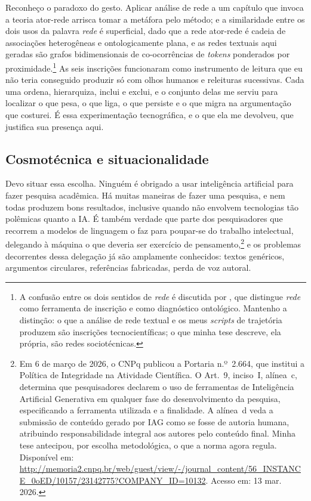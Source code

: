 Reconheço o paradoxo do gesto. Aplicar análise de rede a um capítulo que invoca a teoria ator-rede arrisca tomar a metáfora pelo método; e a similaridade entre os dois usos da palavra \textit{rede} é superficial, dado que a rede ator-rede é cadeia de associações heterogêneas e ontologicamente plana, e as redes textuais aqui geradas são grafos bidimensionais de co-ocorrências de \textit{tokens} ponderados por proximidade.\footnote{A confusão entre os dois sentidos de \textit{rede} é discutida por \textcite[pp.~129--132]{Latour2007Reassembling}, que distingue \textit{rede} como ferramenta de inscrição e como diagnóstico ontológico. Mantenho a distinção: o que a análise de rede textual e os meus \textit{scripts} de trajetória produzem são inscrições tecnocientíficas; o que minha tese descreve, ela própria, são redes sociotécnicas.} As seis inscrições funcionaram como instrumento de leitura que eu não teria conseguido produzir só com olhos humanos e releituras sucessivas. Cada uma ordena, hierarquiza, inclui e exclui, e o conjunto delas me serviu para localizar o que pesa, o que liga, o que persiste e o que migra na argumentação que costurei. É essa experimentação tecnográfica, e o que ela me devolveu, que justifica sua presença aqui.

\subsection{Cosmotécnica e situacionalidade}

Devo situar essa escolha. Ninguém é obrigado a usar inteligência artificial para fazer pesquisa acadêmica. Há muitas maneiras de fazer uma pesquisa, e nem todas produzem bons resultados, inclusive quando não envolvem tecnologias tão polêmicas quanto a IA. É também verdade que parte dos pesquisadores que recorrem a modelos de linguagem o faz para poupar-se do trabalho intelectual, delegando à máquina o que deveria ser exercício de pensamento,\footnote{Em 6 de março de 2026, o CNPq publicou a Portaria n.º~2.664, que institui a Política de Integridade na Atividade Científica. O Art.~9, inciso~I, alínea~c, determina que pesquisadores declarem o uso de ferramentas de Inteligência Artificial Generativa em qualquer fase do desenvolvimento da pesquisa, especificando a ferramenta utilizada e a finalidade. A alínea~d veda a submissão de conteúdo gerado por IAG como se fosse de autoria humana, atribuindo responsabilidade integral aos autores pelo conteúdo final. Minha tese antecipou, por escolha metodológica, o que a norma agora regula. Disponível em: \url{http://memoria2.cnpq.br/web/guest/view/-/journal_content/56_INSTANCE_0oED/10157/23142775?COMPANY_ID=10132}. Acesso em: 13 mar. 2026.} e os problemas decorrentes dessa delegação já são amplamente conhecidos: textos genéricos, argumentos circulares, referências fabricadas, perda de voz autoral.

